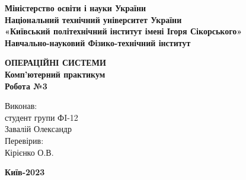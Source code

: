 \documentclass[a4paper,12pt]{article}
\begin{document}
    \pagestyle{fancy}
    \fancyhead{}
    \begin{center}
        \large{\textbf{Міністерство освіти і науки України\\
                Національний технічний університет України\\
                «Київський політехнічний інститут імені Ігоря Сікорського»\\
                Навчально-науковий Фізико-технічний інститут}}\\
        \hfill \break \hfill \break \hfill\break \hfill \break \hfill \break \hfill \break \hfill \break
        \hfill \break \hfill \break \hfill \break
        \begin{center}
            \normalsize{\textbf{ОПЕРАЦІЙНІ СИСТЕМИ\\
            Комп’ютерний практикум\\
            Робота №3}}
        \end{center}
    \end{center}
    \hfill \break \hfill \break \hfill \break \hfill \break \hfill \break \hfill \break \hfill \break
    \hfill \break \hfill \break \hfill \break \hfill \break 
    \begin{flushright}
        \large{ \hspace{35pt} Виконав:\\
            студент групи ФI-12\\
            Завалій Олександр\\} 
        \large{ \hspace{35pt} Перевірив:\\
        Кірієнко О.В.} 
    \end{flushright}
    \hfill \break \hfill \break \hfill \break \hfill \break \hfill \break \hfill \break \hfill \break
    \hfill \break
    \begin{center} \textbf{Київ-2023} \end{center}
    \thispagestyle{empty}
\end{document}
